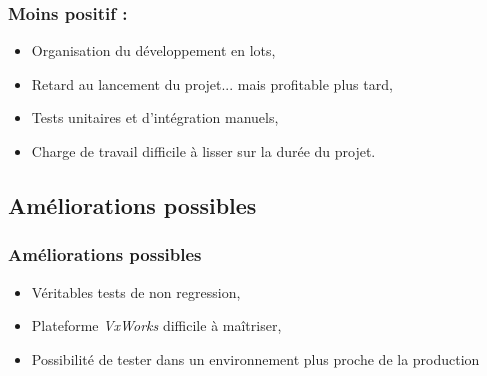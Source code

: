 \documentclass{beamer}
\begin{document}
	\begin{frame}
	\frametitle{Moins positif :}
	\begin{itemize}
		\item Organisation du développement en lots,
		\item Retard au lancement du projet... mais profitable plus tard,
		\item Tests unitaires et d'intégration manuels,
		\item Charge de travail difficile à lisser sur la durée du projet.
	\end{itemize}
	\end{frame}

	\subsection{Améliorations possibles}
	\begin{frame}
	\frametitle{Améliorations possibles}
	\begin{itemize}
		\item Véritables tests de non regression,
		\item Plateforme \textit{VxWorks} difficile à maîtriser,
		\item Possibilité de tester dans un environnement plus proche de la
production
	\end{itemize}
	\end{frame}
\end{document}

